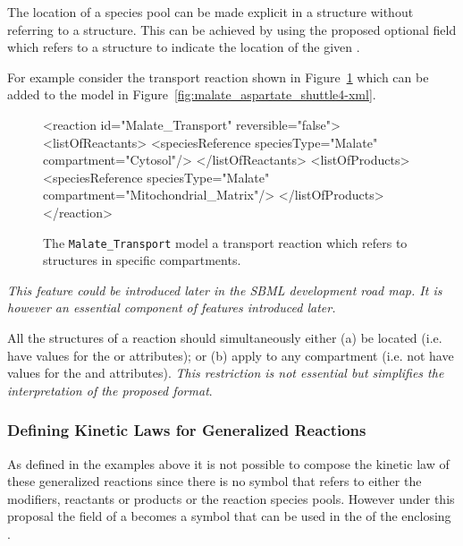 \documentclass{cekarticle}
\begin{document}
The location of a species pool can be made explicit in a  structure
without referring to a  structure.  This can be achieved by using the proposed optional
 field which refers to a  structure to indicate the
location of the given .

For example consider the transport reaction shown in Figure~\ref{fig:Malate_Transport-xml}
which can be added to the model in Figure~\ref{fig:malate_aspartate_shuttle4-xml}.

\begin{figure}[h]
\begin{example}
<reaction id="Malate_Transport" reversible="false">
    <listOfReactants>
        <speciesReference speciesType="Malate" compartment="Cytosol"/>
    </listOfReactants>
    <listOfProducts>
        <speciesReference speciesType="Malate" compartment="Mitochondrial_Matrix"/>
    </listOfProducts>
</reaction>
\end{example}
\caption{The \texttt{Malate\_Transport} model a transport reaction which refers to 
structures in specific compartments.}
\label{fig:Malate_Transport-xml}
\end{figure}


\emph{This feature could be introduced later in the SBML development road map.
It is however an essential component of features introduced later.}

All the  structures of a reaction should simultaneously either
(a) be located (i.e. have values for the  or  attributes);
or (b) apply to any compartment (i.e. not have values for the  and 
attributes). \emph{This restriction is not essential but simplifies the interpretation of
the proposed format}.

\subsubsection{Defining Kinetic Laws for Generalized Reactions}

As defined in the examples above it is not possible to compose the kinetic law of these generalized
reactions since there is no symbol that refers to either the modifiers, reactants or products or the
reaction species pools.  However under this proposal the  field of a
 becomes a symbol that can be used in the  of the
enclosing .
\end{document}
